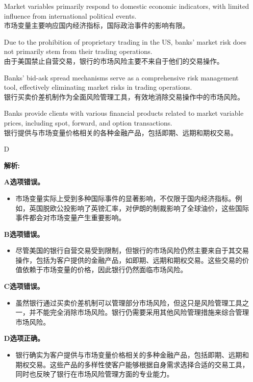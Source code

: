 \documentclass{article}
\newenvironment{explanation}
{\textbf{解析:}\par}
{\par}
\begin{document}
\begin{choices}
    \item Market variables primarily respond to domestic economic indicators, with limited influence from international political events.\\市场变量主要响应国内经济指标，国际政治事件的影响有限。
    \item Due to the prohibition of proprietary trading in the US, banks' market risk does not primarily stem from their trading operations.\\由于美国禁止自营交易，银行的市场风险主要不来自于他们的交易操作。
    \item Banks' bid-ask spread mechanisms serve as a comprehensive risk management tool, effectively eliminating market risks in trading operations.\\银行买卖价差机制作为全面风险管理工具，有效地消除交易操作中的市场风险。
    \item Banks provide clients with various financial products related to market variable prices, including spot, forward, and option transactions.\\银行提供与市场变量价格相关的各种金融产品，包括即期、远期和期权交易。
\end{choices}

\begin{correctanswer}
    D
\end{correctanswer}

\begin{explanation}
    \textbf{A选项错误。}
    \begin{itemize}
        \item 市场变量实际上受到多种国际事件的显著影响，不仅限于国内经济指标。例如，英国脱欧公投影响了英镑汇率，对伊朗的制裁影响了全球油价，这些国际事件都会对市场变量产生重要影响。
    \end{itemize}

    \textbf{B选项错误。}
    \begin{itemize}
        \item 尽管美国的银行自营交易受到限制，但银行的市场风险仍然主要来自于其交易操作，包括为客户提供的金融产品，如即期、远期和期权交易。这些交易的价值依赖于市场变量的价格，因此银行仍然面临市场风险。
    \end{itemize}

    \textbf{C选项错误。}
    \begin{itemize}
        \item 虽然银行通过买卖价差机制可以管理部分市场风险，但这只是风险管理工具之一，并不能完全消除市场风险。银行仍需要采用其他风险管理措施来综合管理市场风险。
    \end{itemize}

    \textbf{D选项正确。}
    \begin{itemize}
        \item 银行确实为客户提供与市场变量价格相关的多种金融产品，包括即期、远期和期权交易。这些产品的多样性使客户能够根据自身需求选择合适的交易工具，同时也反映了银行在市场风险管理方面的专业能力。
    \end{itemize}
\end{explanation}
\end{document}

